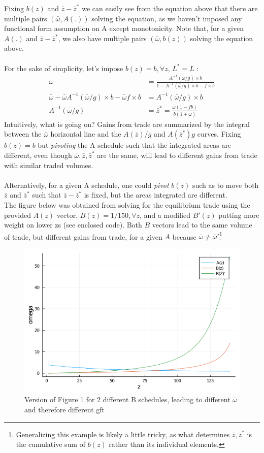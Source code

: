 \documentclass[10pt, final]{article}
\begin{document}
Fixing $b(z)$ and $\bar{z} - \bar{z}^*$ we can easily see from the equation above that there are multiple pairs $(\bar{\omega}, A(.))$ solving the equation, as we haven't imposed any functional form assumption on A except monotonicity. Note that, for a given $A(.)$ and $\bar{z} - \bar{z}^*$, we also have multiple pairs $(\bar{\omega}, b(z))$ solving the equation above. 
\\
\\
For the sake of simplicity, let's impose $b(z) = b, \forall z$, $L^* = L$ :
\begin{align*}
	\bar{\omega} &= \frac{A^{-1}(\bar{\omega} / g) \times b}
	{1 - A^{-1}(\bar{\omega} / g) \times b - f \times b} \\
	\bar{\omega}  - \bar{\omega} A^{-1}(\bar{\omega} / g) \times b - \bar{\omega} f \times b  &= A^{-1}(\bar{\omega} / g) \times b \\
	A^{-1}(\bar{\omega} / g) &= \bar{z}^* = \frac{\bar{\omega}(1 - f b)}{b(1 + \bar{\omega})}
\end{align*}
Intuitively, what is going on? Gains from trade are summarized by the integral between the $\bar{\omega}$ horizontal line and the $A(\bar{z})/g$ and $A(\bar{z}^*)g$ curves. Fixing $b(z) = b$ but \textit{pivoting} the A schedule such that the integrated areas are different, even though $\bar{\omega}, \bar{z}, \bar{z}^*$ are the same, will lead to different gains from trade with similar traded volumes. 
\\
\\
Alternatively, for a given A schedule, one could \textit{pivot} $b(z)$ such as to move both $\bar{z}$ and $\bar{z}^*$ such that $\bar{z} - \bar{z}^*$ is fixed, but the areas integrated are different.
\\
The figure below was obtained from solving for the equilibrium trade using the provided $A(z)$ vector, $B(z) =  1/150, \forall z$, and a modified $B'(z)$ putting more weight on lower zs (see enclosed code). Both $B$ vectors lead to the same volume of trade, but different gains from trade, for a given $A$ because $\bar{\omega} \neq \bar{\omega}'$\footnote{Generalizing this example is likely a little tricky, as what determines $\bar{z}, \bar{z}^*$ is the cumulative sum of $b(z)$ rather than its individual elements.}
\begin{figure}[h!]
\center
\includegraphics[width=12cm]{Fig3}
\caption{Version of Figure 1 for 2 different B schedules, leading to different $\bar{\omega}$ and therefore different gft}
\end{figure}
\end{document}
